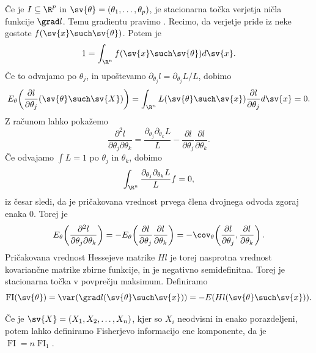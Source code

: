 
Če je $I \subseteq \R^p$ in $\sv{\theta} = (\theta_1, \ldots, \theta_p)$, je
stacionarna točka verjetja ničla funkcije $\grad l$.
Temu gradientu pravimo .
Recimo, da verjetje pride iz neke gostote $f(\sv{x} \such \sv{\theta})$.
Potem je
\[
  1 = \int_{\R^n} f(\sv{x} \such \sv{\theta}) d\sv{x}.
\]
Če to odvajamo po $\theta_j$, in upoštevamo $\partial_{\theta_j} l =
\partial_{\theta_j} L / L$, dobimo
\[
  E_\theta\!\left( \frac{\partial l}{\partial \theta_j} (\sv{\theta} \such
	\sv{X}) \right)
  =
  \int_{\R^n} L(\sv{\theta} \such \sv{x}) \frac{\partial l}{\partial \theta_j}
  d \sv{x} = 0.
\]
Z računom lahko pokažemo
\[
  \frac{\partial^2 l}{\partial \theta_j \partial \theta_k}
  = \frac{\partial_{\theta_j} \partial_{\theta_k} L}{L} - \frac{\partial
	l}{\partial \theta_j} \frac{\partial l}{\partial \theta_k}.
\]
Če odvajamo $\int L = 1$ po $\theta_j$ in $\theta_k$, dobimo
\[
  \int_{\R^n} \frac{\partial_{\theta_j} \partial_{\theta_k} L}{L} f = 0,
\]
iz česar sledi, da je pričakovana vrednost prvega člena dvojnega odvoda zgoraj
enaka $0$.
Torej je
\[
  E_\theta\!\left( \frac{\partial^2 l}{\partial \theta_j \partial \theta_k}
  \right)
  = - E_\theta\!\left( \frac{\partial l}{\partial \theta_j} \frac{\partial
	  l}{\partial \theta_k} \right)
  = - \cov_\theta\!\left( \frac{\partial l}{\partial \theta_j},
	\frac{\partial l}{\partial \theta_k} \right).
\]
Pričakovana vrednost Hessejeve matrike $H l$ je torej nasprotna vrednost
kovariančne matrike zbirne funkcije, in je negativno semidefinitna.
Torej je stacionarna točka v povprečju maksimum.
Definiramo 
\[
  \operatorname{FI}(\sv{\theta})
  = \var(\grad l(\sv{\theta} \such \sv{x}))
  = - E(H l(\sv{\theta} \such \sv{x})).
\]


Če je $\sv{X} = (X_1, X_2, \ldots, X_n)$, kjer so $X_i$ neodvisni in enako
porazdeljeni, potem lahko definiramo Fisherjevo informacijo ene komponente, da
je $\operatorname{FI} = n \operatorname{FI}_1$.

